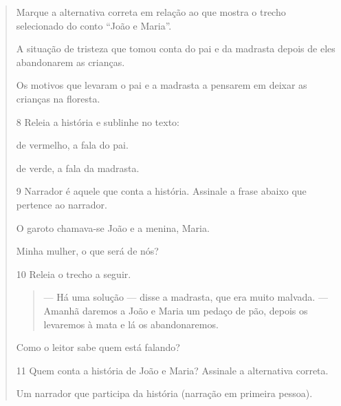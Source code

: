 \begin{boxlist}
\begin{quote}
\begin{escolha}

\item Marque a alternativa correta em relação ao que mostra o trecho
selecionado do conto ``João e Maria''.

\begin{boxlist}
\boxitem[] A situação de tristeza que tomou conta do pai e da madrasta depois
de eles abandonarem as crianças.

\boxitem[X] Os motivos que levaram o pai e a madrasta a pensarem em deixar as
crianças na floresta.
\end{boxlist}
\end{escolha}

\num{8} Releia a história e sublinhe no texto:

\begin{escolha}
\item de vermelho, a fala do pai.

\item de verde, a fala da madrasta.
\end{escolha}

\num{9} Narrador é aquele que conta a história. Assinale a frase abaixo que
pertence ao narrador.

\begin{escolha}
\boxitem[X] O garoto chamava-se João e a menina, Maria.

\boxitem[] Minha mulher, o que será de nós?
\end{escolha}

\num{10} Releia o trecho a seguir.

\begin{quote}
--- Há uma solução --- disse a madrasta, que era muito malvada.
--- Amanhã daremos a João e Maria um pedaço de pão, depois os levaremos
à mata e lá os abandonaremos.
\end{quote}

Como o leitor sabe quem está falando?


\num{11} Quem conta a história de João e Maria? Assinale a alternativa correta.


\begin{boxlist}
\boxitem[] Um narrador que participa da história (narração em primeira pessoa).


\end{boxlist}
\end{quote}
\end{boxlist}
